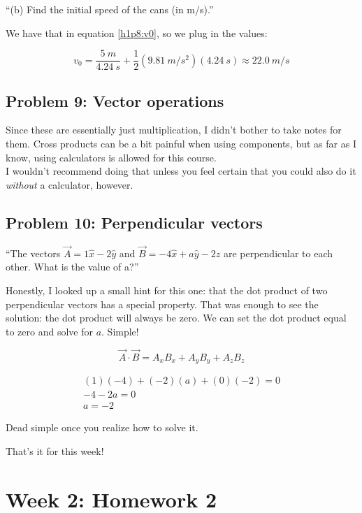 \documentclass[12pt,a4paper]{report}
\begin{document}
``(b) Find the initial speed of the cans (in m/s).''

We have that in equation \eqref{h1p8:v0}, so we plug in the values:

\begin{equation}
v_0 = \frac{\SI{5}{m}}{\SI{4.24}{s}} + \frac{1}{2} (\SI{9.81}{m/s^2}) (\SI{4.24}{s}) \approx \SI{22.0}{m/s}
\end{equation}

\section{Problem 9: Vector operations}

Since these are essentially just multiplication, I didn't bother to take notes for them. Cross products can be a bit painful when using components, but as far as I know, using calculators is allowed for this course.\\
I wouldn't recommend doing that unless you feel certain that you could also do it \emph{without} a calculator, however.

\section{Problem 10: Perpendicular vectors}

``The vectors $\vec{A} = 1 \hat{x} - 2 \hat{y}$ and $\vec{B} = -4 \hat{x} + a \hat{y} - 2\hat{z}$ are perpendicular to each other. What is the value of a?''

Honestly, I looked up a small hint for this one: that the dot product of two perpendicular vectors has a special property. That was enough to see the solution: the dot product will always be zero. We can set the dot product equal to zero and solve for $a$. Simple!

\begin{equation}
\vec{A} \cdot \vec{B} = A_x B_x + A_y B_y + A_z B_z
\end{equation}

\begin{align}
(1)(-4) + (-2)(a) + (0)(-2) = 0\\
-4 - 2a = 0\\
a = -2
\end{align}

Dead simple once you realize how to solve it.

That's it for this week!

\chapter{Week 2: Homework 2}
\end{document}
